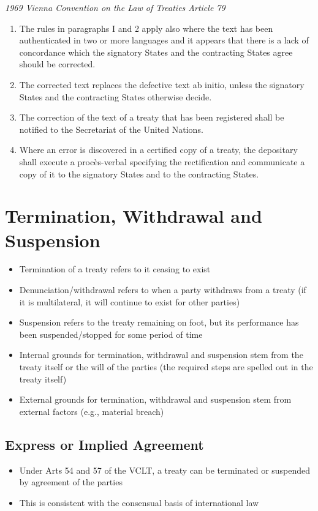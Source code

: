 \begin{conventiondetails}{\textit{1969 Vienna Convention on the Law of Treaties Article 79}}
\begin{enumerate}
\begin{enumerate}
        \end{enumerate}
        \item The rules in paragraphs I and 2 apply also where the text has been authenticated in two or more languages and it appears that there is a lack of concordance which the signatory States and the contracting States agree should be corrected. 
        \item The corrected text replaces the defective text ab initio, unless the signatory States and the contracting States otherwise decide. 
        \item The correction of the text of a treaty that has been registered shall be notified to the Secretariat of the United Nations. 
        \item Where an error is discovered in a certified copy of a treaty, the depositary shall execute a procès-verbal specifying the rectification and communicate a copy of it to the signatory States and to the contracting States.
    \end{enumerate}
\end{conventiondetails}

\section{Termination, Withdrawal and Suspension}
\begin{itemize}
    \item Termination of a treaty refers to it ceasing to exist
    \item Denunciation/withdrawal refers to when a party withdraws from a treaty (if it is multilateral, it will continue to exist for other parties)
    \item Suspension refers to the treaty remaining on foot, but its performance has been suspended/stopped for some period of time
    \item Internal grounds for termination, withdrawal and suspension stem from the treaty itself or the will of the parties (the required steps are spelled out in the treaty itself)
    \item External grounds for termination, withdrawal and suspension stem from external factors (e.g., material breach)
\end{itemize}

\subsection{Express or Implied Agreement}
\begin{itemize}
    \item Under Arts 54 and 57 of the VCLT, a treaty can be terminated or suspended by agreement of the parties
    \item This is consistent with the consensual basis of international law
\end{itemize}

